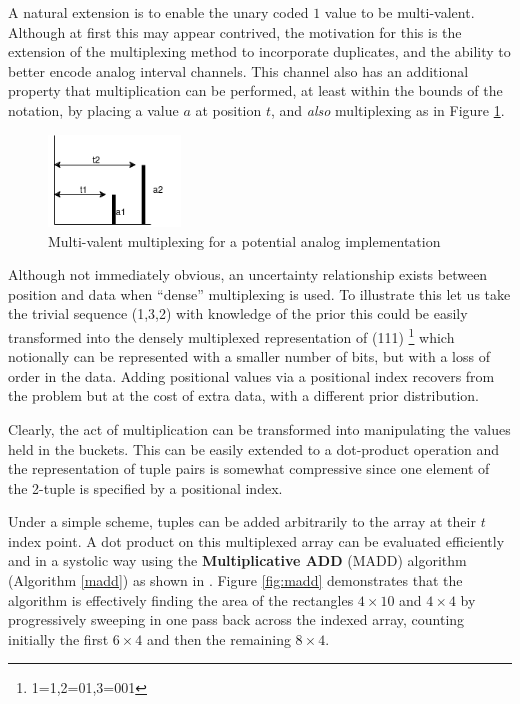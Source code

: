 \documentclass{article}
\begin{document}
A natural extension is to enable the unary coded $1$ value to be multi-valent. Although at first this may appear contrived, the motivation for this is the extension of the multiplexing method to incorporate duplicates, and the ability to better encode analog interval channels. This channel also has an additional property that multiplication can be performed, at least within the bounds of the notation, by placing a value $a$ at position $t$, and \textit{also} multiplexing as in Figure \ref{fig:multiply}.


\begin{figure}[ht]
	\centerline{\includegraphics[width=100pt]{figures/multiplex2.png}}
	\caption{Multi-valent multiplexing for a potential analog implementation}\label{fig:multiply}
\end{figure}

Although not immediately obvious, an uncertainty relationship exists between position and data when ``dense'' multiplexing is used. To illustrate this let us take the trivial sequence (1,3,2) with knowledge of the prior this could be easily transformed into the densely multiplexed representation of (111) \footnote{1=1,2=01,3=001} which notionally can be represented with a smaller number of bits, but with a loss of order in the data. Adding positional values via a positional index recovers from the problem but at the cost of extra data, with a different prior distribution.

Clearly, the act of multiplication can be transformed into manipulating the values held in the buckets. This can be easily extended to a dot-product operation and the representation of tuple pairs is somewhat compressive since one element of the 2-tuple is specified by a positional index.

Under a simple scheme, tuples can be added arbitrarily to the array at their $t$ index point.  A dot product on this multiplexed array can be evaluated efficiently and in a systolic way using the \textbf{Multiplicative ADD} (MADD) algorithm (Algorithm \ref{madd}) as shown in \cite{jonny-asynch}. Figure \ref{fig:madd} demonstrates that the algorithm is effectively finding the area of the rectangles $4 \times 10$ and $4 \times 4$ by progressively sweeping in one pass back across the indexed array, counting initially the first $6 \times 4$ and then the remaining $8 \times 4$.
\end{document}
